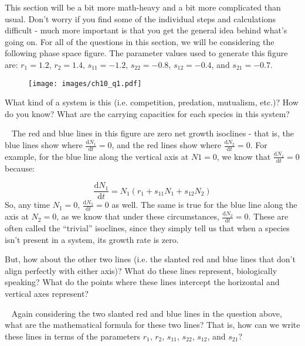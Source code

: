 \documentclass[12pt]{article}
\begin{document}
\date{}
\maketitle

This section will be a bit more math-heavy and a bit more complicated than usual. Don't worry if you find some of the individual steps and calculations difficult - much more important is that you get the general idea behind what's going on. For all of the questions in this section, we will be considering the following phase space figure. The parameter values used to generate this figure are: $r_1 = 1.2$, $r_2 = 1.4$, $s_{11} = -1.2$, $s_{22} = -0.8$, $s_{12} = -0.4$, and $s_{21} = -0.7$.

\begin{figure}[H]
  \centering
  \texttt{[image: images/ch10\_q1.pdf]}
\end{figure}

\newline
What kind of a system is this (i.e. competition, predation, mutualism, etc.)? How do you know? What are the carrying capacities for each species in this system?

~\newline
{}
\newline
The red and blue lines in this figure are zero net growth isoclines - that is, the blue lines show where $\frac{\mathrm{d}N_1}{\mathrm{d}t} = 0$, and the red lines show where $\frac{\mathrm{d}N_2}{\mathrm{d}t} = 0$. For example, for the blue line along the vertical axis at $N1 = 0$, we know that $\frac{\mathrm{d}N_1}{\mathrm{d}t} = 0$ because:

$$ \frac{\mathrm{d}N_1}{\mathrm{d}t} = N_1(r_1 + s_{11} N_1 + s_{12} N_2) $$
So, any time $N_1 = 0$, $\frac{\mathrm{d}N_1}{\mathrm{d}t} = 0$ as well. The same is true for the blue line along the axis at $N_2 = 0$, as we know that under these circumstances, $\frac{\mathrm{d}N_2}{\mathrm{d}t} = 0$. These are often called the ``trivial'' isoclines, since they simply tell us that when a species isn't present in a system, its growth rate is zero.

But, how about the other two lines (i.e. the slanted red and blue lines that don't align perfectly with either axis)? What do these lines represent, biologically speaking? What do the points where these lines intercept the horizontal and vertical axes represent?

~\newline
{}
\newline
Again considering the two slanted red and blue lines in the question above, what are the mathematical formula for these two lines? That is, how can we write these lines in terms of the parameters $r_1$, $r_2$, $s_{11}$, $s_{22}$, $s_{12}$, and $s_{21}$?
\end{document}
